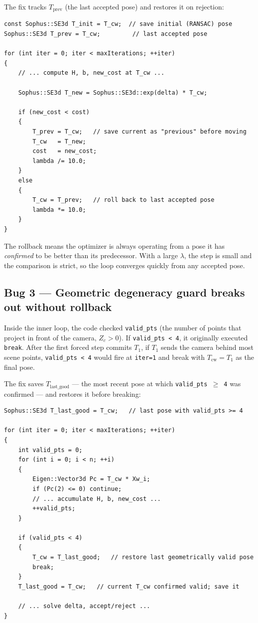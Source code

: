 \documentclass[12pt,a4paper]{article}
\begin{document}
The fix tracks $T_\text{prev}$ (the last accepted pose) and restores it on rejection:

\begin{lstlisting}[style=cpp,
  caption={Standard LM accept/reject with rollback ---
           \texttt{solvePnPWeighted()}}]
const Sophus::SE3d T_init = T_cw;  // save initial (RANSAC) pose
Sophus::SE3d T_prev = T_cw;         // last accepted pose

for (int iter = 0; iter < maxIterations; ++iter)
{
    // ... compute H, b, new_cost at T_cw ...

    Sophus::SE3d T_new = Sophus::SE3d::exp(delta) * T_cw;

    if (new_cost < cost)
    {
        T_prev = T_cw;   // save current as "previous" before moving
        T_cw   = T_new;
        cost   = new_cost;
        lambda /= 10.0;
    }
    else
    {
        T_cw = T_prev;   // roll back to last accepted pose
        lambda *= 10.0;
    }
}
\end{lstlisting}

The rollback means the optimizer is always operating from a pose it has
\emph{confirmed} to be better than its predecessor. With a large $\lambda$, the step
is small and the comparison is strict, so the loop converges quickly from any
accepted pose.

\subsection{Bug 3 — Geometric degeneracy guard breaks out without rollback}

Inside the inner loop, the code checked \texttt{valid\_pts} (the number of points
that project in front of the camera, $Z_c > 0$). If \texttt{valid\_pts\,<\,4}, it
originally executed \texttt{break}. After the first forced step commits $T_1$, if
$T_1$ sends the camera behind most scene points, \texttt{valid\_pts\,<\,4} would
fire at \texttt{iter=1} and break with $T_\text{cw}=T_1$ as the final pose.

The fix saves $T_\text{last\_good}$ — the most recent pose at which
\texttt{valid\_pts\,$\geq$\,4} was confirmed — and restores it before breaking:

\begin{lstlisting}[style=cpp,
  caption={Geometric degeneracy guard with rollback ---
           \texttt{solvePnPWeighted()}}]
Sophus::SE3d T_last_good = T_cw;   // last pose with valid_pts >= 4

for (int iter = 0; iter < maxIterations; ++iter)
{
    int valid_pts = 0;
    for (int i = 0; i < n; ++i)
    {
        Eigen::Vector3d Pc = T_cw * Xw_i;
        if (Pc(2) <= 0) continue;
        // ... accumulate H, b, new_cost ...
        ++valid_pts;
    }

    if (valid_pts < 4)
    {
        T_cw = T_last_good;   // restore last geometrically valid pose
        break;
    }
    T_last_good = T_cw;   // current T_cw confirmed valid; save it

    // ... solve delta, accept/reject ...
}
\end{lstlisting}
\end{document}
